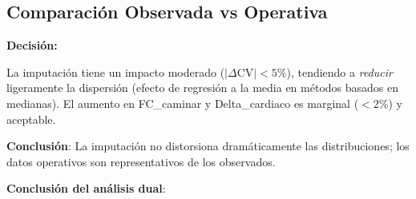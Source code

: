 \documentclass[12pt,letterpaper,twoside]{report}
\begin{document}
\begin{calculobox}
\subsection{Comparación Observada vs Operativa}

\begin{table}[H]
\centering
\caption{Coeficiente de Variación: Observado vs Operativo (promedio 10 usuarios)}
\label{tab:variability_dual}
\end{table}

\begin{decisionbox}
\textbf{Decisión:}

La imputación tiene un impacto moderado ($|\Delta\text{CV}| < 5\%$), tendiendo a \textit{reducir} ligeramente la dispersión (efecto de regresión a la media en métodos basados en medianas). El aumento en FC\_caminar y Delta\_cardiaco es marginal ($<2\%$) y aceptable.

\textbf{Conclusión}: La imputación no distorsiona dramáticamente las distribuciones; los datos operativos son representativos de los observados.
\end{decisionbox}

\begin{conclusionbox}
\textbf{Conclusión del análisis dual}:


\end{conclusionbox}
\end{calculobox}
\end{document}
